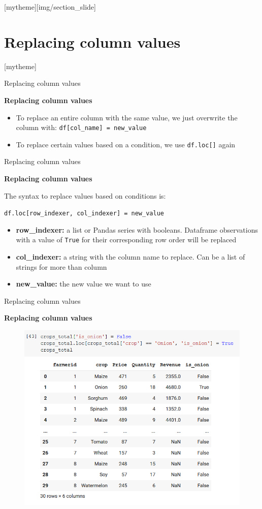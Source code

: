 \documentclass[aspectratio=169]{beamer}
\newcommand{\sectionpic}[2]{
	\setbeamertemplate{section page}[mytheme][#2]
	\section{#1}
	\setbeamertemplate{section page}[mytheme]
}
\begin{document}
\sectionpic{Replacing column values}{img/section_slide}

\begin{frame}{Replacing column values}

	\textbf{Replacing column values}

	\begin{itemize}
		\item To replace an entire column with the same value, we just overwrite the column with: \texttt{df[col\_name] = new\_value}
		\item To replace certain values based on a condition, we use \texttt{df.loc[]} again
	\end{itemize}

\end{frame}

\begin{frame}{Replacing column values}

	\textbf{Replacing column values}

	The syntax to replace values based on conditions is:

	\texttt{df.loc[row\_indexer, col\_indexer] = new\_value}

	\begin{itemize}
		\item \textbf{row\_indexer:} a list or Pandas series with booleans. Dataframe observations with a value of \texttt{True} for their corresponding row order will be replaced
		\item \textbf{col\_indexer:} a string with the column name to replace. Can be a list of strings for more than column
		\item \textbf{new\_value:} the new value we want to use
	\end{itemize}

\end{frame}

\begin{frame}{Replacing column values}

	\textbf{Replacing column values}

	\begin{figure}
		\centering
		\includegraphics[width=0.57\linewidth]{img/replace_values.png}
	\end{figure}

\end{frame}
\end{document}
